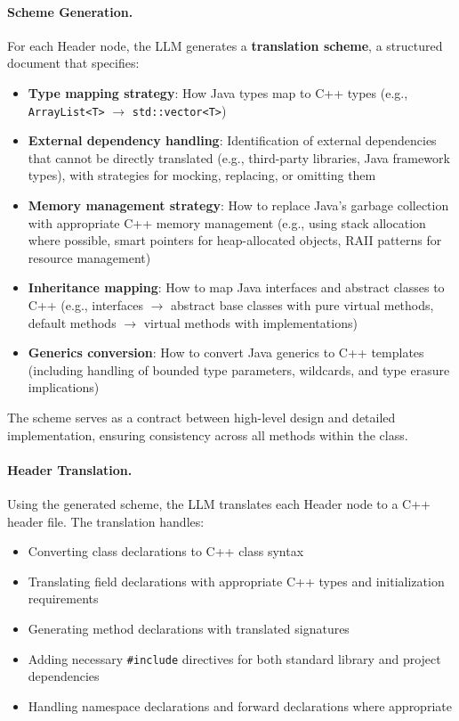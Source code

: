 \paragraph{Scheme Generation.} For each Header node, the LLM generates a \textbf{translation scheme}, a structured document that specifies:
\begin{itemize}
\item \textbf{Type mapping strategy}: How Java types map to C++ types (e.g., \texttt{ArrayList<T>} $\rightarrow$ \texttt{std::vector<T>})
\item \textbf{External dependency handling}: Identification of external dependencies that cannot be directly translated (e.g., third-party libraries, Java framework types), with strategies for mocking, replacing, or omitting them
\item \textbf{Memory management strategy}: How to replace Java's garbage collection with appropriate C++ memory management (e.g., using stack allocation where possible, smart pointers for heap-allocated objects, RAII patterns for resource management)
\item \textbf{Inheritance mapping}: How to map Java interfaces and abstract classes to C++ (e.g., interfaces $\rightarrow$ abstract base classes with pure virtual methods, default methods $\rightarrow$ virtual methods with implementations)
\item \textbf{Generics conversion}: How to convert Java generics to C++ templates (including handling of bounded type parameters, wildcards, and type erasure implications)
\end{itemize}

The scheme serves as a contract between high-level design and detailed implementation, ensuring consistency across all methods within the class.

\paragraph{Header Translation.} Using the generated scheme, the LLM translates each Header node to a C++ header file. The translation handles:
\begin{itemize}
\item Converting class declarations to C++ class syntax
\item Translating field declarations with appropriate C++ types and initialization requirements
\item Generating method declarations with translated signatures
\item Adding necessary \texttt{\#include} directives for both standard library and project dependencies
\item Handling namespace declarations and forward declarations where appropriate
\end{itemize}

